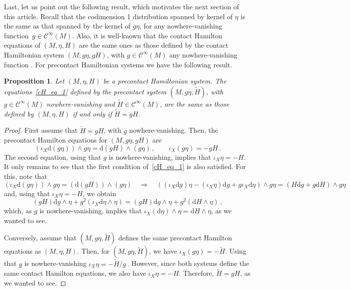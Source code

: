\documentclass[11pt,twoside]{article}
\theoremstyle{plain}
\newtheorem{proposition}[theorem]{Proposition}
\theoremstyle{definition}
\renewcommand{\d}{\mathrm{d}}
\newcommand{\Cinfty}{\mathscr{C}^\infty}
\newcommand*{\inn}[1]{\iota_{#1}}
\def\d{\mathrm{d}}
\def\d{\mathrm{d}}
\begin{document}
Last, let us point out the following result, which motivates the next section of this article. 
Recall that the codimension 1 distribution spanned by kernel of $\eta$ is the same as 
that spanned by the kernel of $g\eta$, 
for any nowhere-vanishing function~$g\in\Cinfty(M)$.
Also, it is well-known that the contact Hamilton equations of $(M,\eta,H)$ 
are the same ones as those defined by the contact Hamiltonian system $(M,g\eta,g H)$, 
with $g\in\Cinfty(M)$ any nowhere-vanishing function
\cite{sandwich,inverse-contact}.
For precontact Hamiltonian systems we have the following result.
\begin{proposition}
    Let $(M,\eta, H)$ be a precontact Hamiltonian system. The equations~\eqref{cH_eq_1} defined by the precontact system $(M,g\eta,\widetilde H)$, with $g\in\Cinfty(M)$ nowhere-vanishing and $\widetilde H\in\Cinfty(M)$, are the same as those defined by $(M,\eta,H)$ if and only if $\widetilde H = g H$.   
\end{proposition}

\begin{proof}
    First assume that $\widetilde H = gH$, with $g$ nowhere-vanishing. Then, the precontact Hamilton equations for $(M,g\eta, gH)$ are
\begin{equation}
		(\inn{X} \d (g\eta)) \wedge g\eta = \d (gH) \wedge (g\eta) \,,
		\qquad
		\inn{X}( g\eta )= -gH \,.
\end{equation}
The second equation, using that $g$ is nowhere-vanishing, implies that
 $\inn{X}\eta = -H$. It only remains to see that the first condition of~\eqref{cH_eq_1} is also satisfied. For this, note that
$$(\inn{X} \d (g\eta)) \wedge g\eta = (\d (gH)) \wedge (g\eta) \quad \Longrightarrow \quad ((\inn{X}\d g)  \eta -(\inn{X}\eta)\d g +g \inn{X}\d \eta )\wedge g\eta = (H \d g + g\d H)\wedge g \eta$$
and, using that $\inn{X}\eta = -H$, we obtain
$$(gH)\d g \wedge \eta + g^2(\inn{X}\d \eta\wedge \eta) = (gH)\d g \wedge \eta + g^2(\d H \wedge \eta)\,,$$
which, as $g$ is nowhere-vanishing, implies that
$\inn{X}(\d\eta) \wedge \eta = \d H \wedge \eta$,
as we wanted to see.

Conversely, assume that $(M,g\eta, \widetilde H)$ defines the same precontact Hamilton equations as $(M,\eta,H)$. Then, for $(M,g\eta,\widetilde H)$, we have
$\inn{X}(g\eta ) = -\widetilde H$.
Using that $g$ is nowhere-vanishing
$\displaystyle\inn{X}\eta = -\widetilde H/g\,.$
However, since both systems define the same contact Hamilton equations, 
we also have $\inn{X}\eta = -H$. 
Therefore, $\widetilde H = gH$, as we wanted to see.
\end{proof}
\end{document}
